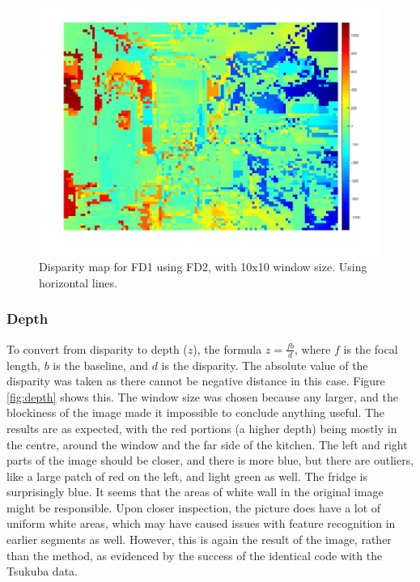 \documentclass[a4paper, 10pt, conference]{ieeeconf}
\begin{document}
\begin{figure}[!ht]
  \centering
  \includegraphics[width=\linewidth]{pic/q2_2_cd4_dis}
  \caption{Disparity map for FD1 using FD2, with 10x10 window size. Using horizontal lines.}
  \label{fig:depth10}
\end{figure}

\subsubsection{Depth}
To convert from disparity to depth ($z$), the formula $z = \frac{fb}{d}$, where $f$ is the focal length, $b$ is the baseline, and $d$ is the disparity. The absolute value of the disparity was taken as there cannot be negative distance in this case. Figure \ref{fig:depth} shows this. The window size was chosen because any larger, and the blockiness of the image made it impossible to conclude anything useful. The results are as expected, with the red portions (a higher depth) being mostly in the centre, around the window and the far side of the kitchen. The left and right parts of the image should be closer, and there is more blue, but there are outliers, like a large patch of red on the left, and light green as well. The fridge is surprisingly blue. It seems that the areas of white wall in the original image might be responsible. Upon closer inspection, the picture does have a lot of uniform white areas, which may have caused issues with feature recognition in earlier segments as well. However, this is again the result of the image, rather than the method, as evidenced by the success of the identical code with the Tsukuba data. 
\end{document}
